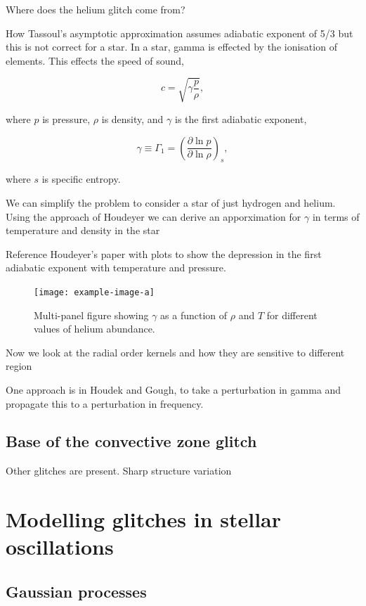 Where does the helium glitch come from?

How Tassoul's asymptotic approximation assumes adiabatic exponent of 5/3 but this is not correct for a star. In a star, gamma is effected by the ionisation of elements. This effects the speed of sound,

\begin{equation}
    c = \sqrt{\gamma \frac{p}{\rho}},
\end{equation}

where \(p\) is pressure, \(\rho\) is density, and \(\gamma\) is the first adiabatic exponent,

\begin{equation}
    \gamma \equiv \Gamma_1 = \left( \frac{\partial \ln p}{\partial \ln \rho} \right)_s,
\end{equation}

where \(s\) is specific entropy.

We can simplify the problem to consider a star of just hydrogen and helium. Using the approach of Houdeyer we can derive an apporximation for \(\gamma\) in terms of temperature and density in the star

Reference Houdeyer's paper with plots to show the depression in the first adiabatic exponent with temperature and pressure. 

\begin{figure}
    \centering
    \texttt{[image: example-image-a]}
    \caption{Multi-panel figure showing \(\gamma\) as a function of \(\rho\) and \(T\) for different values of helium abundance.}
    \label{fig:gamma-temp-density}
\end{figure}

Now we look at the radial order kernels and how they are sensitive to different region


One approach is in Houdek and Gough, to take a perturbation in gamma and propagate this to a perturbation in frequency.

\subsection{Base of the convective zone glitch}\label{sec:bcz-glitch}

Other glitches are present. Sharp structure variation

\section[Modelling the glitch]{Modelling glitches in stellar oscillations}


\subsection{Gaussian processes }\label{sec:glitch-gp}

